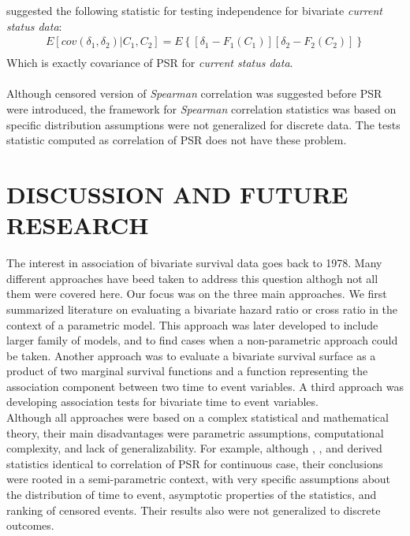 \documentclass[]{article}
\begin{document}
\cite{ding2004testing} suggested the following statistic for testing independence for bivariate \emph{current status data}:
	$$
	\begin{aligned}
		 E[cov(\delta_1, \delta_2)|C_1,C_2] = E\left\{ [\delta_1 - F_1(C_1)][\delta_2 - F_2(C_2)]  \right\}\\
	\end{aligned}
	$$
Which is exactly covariance of PSR for \emph{current status data}.\\
~\\
Although censored version of \emph{Spearman} correlation was suggested before PSR were introduced, the framework for \emph{Spearman} correlation statistics was based on specific distribution assumptions were not generalized for discrete data. The tests statistic computed as correlation of PSR does not have these problem.


\section{DISCUSSION AND FUTURE RESEARCH}

The interest in association of bivariate survival data goes back to 1978. Many different approaches have beed taken to address this question althogh not all them were covered here. Our focus was on the three main approaches. We first summarized literature on evaluating a bivariate hazard ratio or cross ratio in the context of a parametric model. This approach was later developed to include larger family of models, and to find cases when a non-parametric approach could be taken. Another approach was to evaluate a bivariate survival surface as a product of two marginal survival functions and a function representing the association component between two time to event variables. A third approach was developing association tests for bivariate time to event variables.\\

Although all approaches were based on a complex statistical and mathematical theory, their main disadvantages were parametric assumptions, computational complexity, and lack of generalizability. For example, although \cite{cuzick1982rank}, \cite{dabrowska1988kaplan}, and \cite{ding2004testing} derived statistics identical to correlation of PSR for continuous case, their conclusions were rooted in a semi-parametric context, with very specific assumptions about the distribution of time to event, asymptotic properties of the statistics, and ranking of censored events. Their results also were not generalized to discrete outcomes.\\
\end{document}
